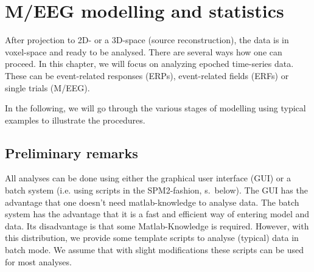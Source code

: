 \chapter{M/EEG modelling and statistics}
\label{ch:eeg_stats}
After projection to 2D- or a 3D-space (source reconstruction), the
data is in voxel-space and ready to be analysed. There are several
ways how one can proceed. In this chapter, we will focus on analyzing
epoched time-series data. These can be event-related responses (ERPs),
event-related fields (ERFs) or single trials (M/EEG). 

In the following, we will go through the various stages of modelling
using typical examples to illustrate the procedures.

\section{Preliminary remarks}
All analyses can be done using either the graphical user interface
(GUI) or a batch system (i.e. using scripts in the SPM2-fashion,
s.~below). The GUI has the advantage that one doesn't need
matlab-knowledge to analyse data. The batch system has the
advantage that it is a fast and efficient way of entering model and
data. Its disadvantage is that some Matlab-Knowledge is
required. However, with this distribution, we provide some template
scripts to analyse (typical) data in batch mode. We assume that with slight
modifications these scripts can be used for most analyses.

